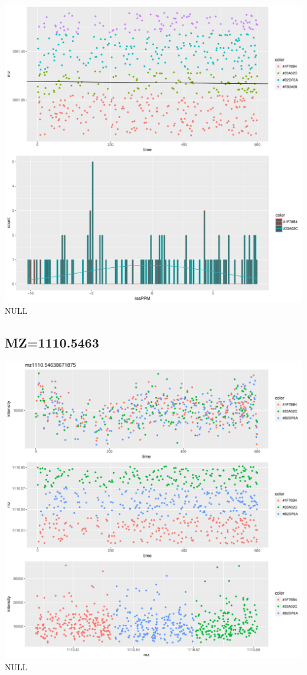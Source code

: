 \documentclass[]{article}
\begin{document}
\includegraphics{Supplementary_document_files/figure-latex/filter.lm.1261-1.pdf}
NULL

\subsection{MZ=1110.5463}\label{mz1110.5463}

\includegraphics{Supplementary_document_files/figure-latex/cluster.mz.1110-1.pdf}
NULL
\end{document}
